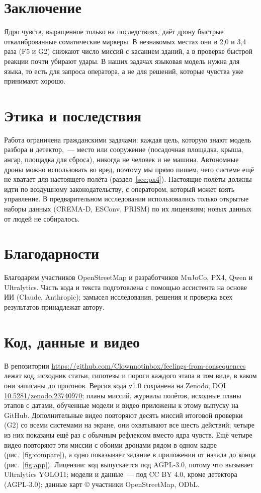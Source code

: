 \documentclass[10pt]{article}
\begin{document}
\section{Заключение}
Ядро чувств, выращенное только на последствиях, даёт дрону быстрые откалиброванные соматические маркеры. В незнакомых местах они
в 2,0 и 3,4 раза (F5 и G2) снижают число миссий с касанием зданий, а в проверке быстрой реакции почти убирают удары. В наших задачах
языковая модель нужна для языка, то есть для запроса оператора, а не для решений, которые чувства уже принимают хорошо.
\GCONCL

\section*{Этика и последствия}
Работа ограничена гражданскими задачами: каждая цель, которую знают модель разбора и детектор,~--- место или сооружение
(посадочная площадка, крыша, ангар, площадка для сброса), никогда не человек и не машина. Автономные дроны можно использовать во
вред, поэтому мы прямо пишем, чего системе ещё не хватает для настоящего полёта (раздел~\ref{sec:px4}). Настоящие полёты должны
идти по воздушному законодательству, с оператором, который может взять управление. В предварительном исследовании использовались
только открытые наборы данных (CREMA-D, ESConv, PRISM) по их лицензиям; новых данных от людей не собиралось.

\section*{Благодарности}
Благодарим участников Open\-Street\-Map и разработчиков MuJoCo, PX4, Qwen и Ultra\-lytics. Часть кода и текста подготовлена с помощью
ассистента на основе ИИ (Claude, Anthropic); замысел исследования, решения и проверка всех результатов принадлежат автору.

\section*{Код, данные и видео}
В репозитории {\url{https://github.com/Clownnotinbox/feelings-from-consequences}}
лежат код, исходник статьи, гипотезы и пороги каждого этапа в том виде, в каком они записаны до прогонов. Версия кода v1.0 сохранена на Zenodo, DOI \href{https://doi.org/10.5281/zenodo.23740970}{10.5281/zenodo.23740970}; планы миссий, журналы полётов, исходные планы этапов с датами,
обученные модели и видео приложены к этому выпуску на GitHub. Дополнительные видео повторяют десять миссий
итоговой проверки (G2) со всеми системами на экране, они охватывают все шесть действий; четыре из них показаны ещё раз с обычным
рефлексом вместо ядра чувств. Ещё четыре видео повторяют эти миссии с обоими дронами рядом в одном кадре (рис.~\ref{fig:compare}),
а одно показывает задание в приложении от начала до конца (рис.~\ref{fig:app}). Лицензии: код выпускается под AGPL-3.0, потому что вызывает Ultralytics YOLO11; модели и данные~---
под CC BY 4.0, кроме детектора (AGPL-3.0); данные карт \copyright{} участники OpenStreetMap, ODbL.
\end{document}
